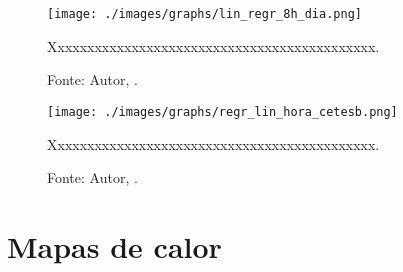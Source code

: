 \lipsum[100]




\begin{figure}[H]
    \centering
    \texttt{[image: ./images/graphs/lin\_regr\_8h\_dia.png]}
    \caption{Xxxxxxxxxxxxxxxxxxxxxxxxxxxxxxxxxxxxxxxxxxxx.}
    \label{fig:lin_regr_8h_dia.png}
    \caption*{Fonte: Autor, \imprimirdata.}
\end{figure}




\lipsum[100]




\begin{figure}[H]
    \centering
    \texttt{[image: ./images/graphs/regr\_lin\_hora\_cetesb.png]}
    \caption{Xxxxxxxxxxxxxxxxxxxxxxxxxxxxxxxxxxxxxxxxxxxx.}
    \label{fig:regr_lin_hora_cetesb.png}
    \caption*{Fonte: Autor, \imprimirdata.}
\end{figure}




\lipsum[100]



\section{Mapas de calor}



\lipsum[100]

